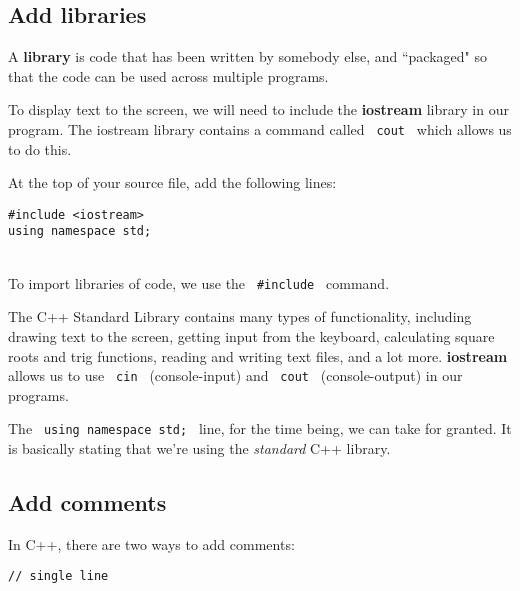 \documentclass[a4paper,12pt]{book}
\begin{document}
            \newpage
            \subsection*{ Add libraries }
            
\begin{WrapTextSide}
    A \textbf{ library } is code that has been written by somebody else,
    and ``packaged" so that the code can be used across multiple programs.
\end{WrapTextSide}

               To display text to the screen, we will need to include
               the \textbf{ iostream } library in our program. The
               iostream library contains a command called \texttt{ cout }
               which allows us to do this.

               At the top of your source file, add the following lines: ~\\

\begin{lstlisting}[style=code]
#include <iostream>
using namespace std;
\end{lstlisting}

                ~\\
               To import libraries of code, we use the \texttt{ \#include } command.

               The C++ Standard Library contains many types of functionality,
               including drawing text to the screen, getting input from the keyboard,
               calculating square roots and trig functions, reading and writing
               text files, and a lot more.
               \textbf{ iostream } allows us to use \texttt{ cin } (console-input)
               and \texttt{ cout } (console-output) in our programs.

               The \texttt{ using namespace std; } line, for the time being,
               we can take for granted. It is basically stating that we're using
               the \textit{ standard } C++ library.

           
            \subsection*{ Add comments }

                In C++, there are two ways to add comments:
                
\begin{lstlisting}[style=code]
// single line
\end{lstlisting}
\end{document}

